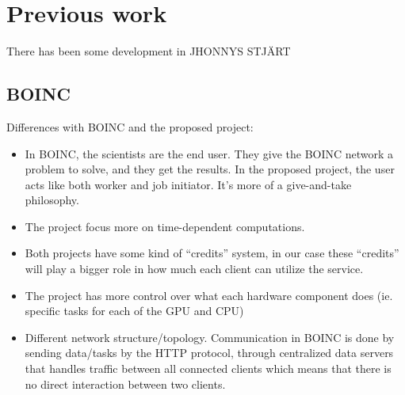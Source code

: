 \chapter{Previous work}
There has been some development in JHONNYS STJÄRT

\section{BOINC}

Differences with BOINC and the proposed project:
\begin{itemize}
	\item In BOINC, the scientists are the end user. They give the BOINC network
		a problem to solve, and they get the results. In the proposed project, 
		the user acts like both worker and job initiator. It’s more of a 
		give-and-take philosophy.
	\item The project focus more on time-dependent computations.
	\item Both projects have some kind of “credits” system, in our case these
		“credits” will play a bigger role in how much each client can utilize
		the service.
	\item The project has more control over what each hardware component does
		(ie. specific tasks for each of the GPU and CPU)
	\item Different network structure/topology. Communication in BOINC is done
		by sending data/tasks by the HTTP protocol, through centralized data
		servers that handles traffic between all connected clients which means 
		that there is no direct interaction between two clients. 
\end{itemize}

